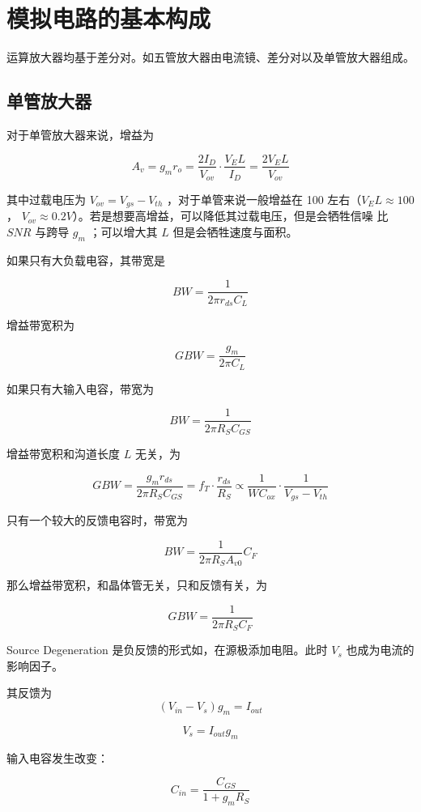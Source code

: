 \documentclass[cn,11pt,chinese,black,simple]{../elegantbook}
\begin{document}
\fi 
\def\chapname{02iccomp}

\chapter{模拟电路的基本构成}

运算放大器均基于差分对。如五管放大器由电流镜、差分对以及单管放大器组成。


\section{单管放大器}

对于单管放大器来说，增益为 


\[A_v = g_m r_o = \frac{2 I_D}{V_{ov}} \cdot \frac{V_E L}{I_D} = \frac{2 V_E L }{V_{ov}}\]

其中过载电压为 \(V_{ov} = V_{gs} - V_{th}\) ，对于单管来说一般增益在 100 左右（\(V_{E} L \approx 100\) ， \(V_{ov} \approx 0.2 V\)）。若是想要高增益，可以降低其过载电压，但是会牺牲信噪 比 \(SNR\) 与跨导 \(g_m\) ；可以增大其 \(L\) 但是会牺牲速度与面积。

如果只有大负载电容，其带宽是 

\[BW = \frac{1}{2 \pi r_{ds} C_L}\]

增益带宽积为 

\[GBW = \frac{g_m}{2 \pi C_L}\]

如果只有大输入电容，带宽为

\[BW = \frac{1}{2 \pi R_S C_{GS}}\]

增益带宽积和沟道长度 \(L\) 无关，为

\[GBW = \frac{g_m r_{ds}}{2 \pi R_S C_{GS}} = f_T \cdot \frac{r_{ds}}{R_S} \propto \frac{1}{W C_{{ox}}} \cdot \frac{1}{V_{gs} - V_{th}}\]

只有一个较大的反馈电容时，带宽为

\[BW = \frac{1}{2 \pi R_S A_{v0}} C_F\]

那么增益带宽积，和晶体管无关，只和反馈有关，为

\[GBW = \frac{1}{2 \pi R_S C_F}\]

Source Degeneration 是负反馈的形式如\figref{\chapname 1}，在源极添加电阻。此时 \(V_s\) 也成为电流的影响因子。


其反馈为 \[(V_{in} - V_s) g_m = I_{out}\] 

\[V_s = I_{out} g_m\]

输入电容发生改变：

\[C_{in} = \frac{C_{GS}}{1 + g_m R_S}\] 
\end{document}
